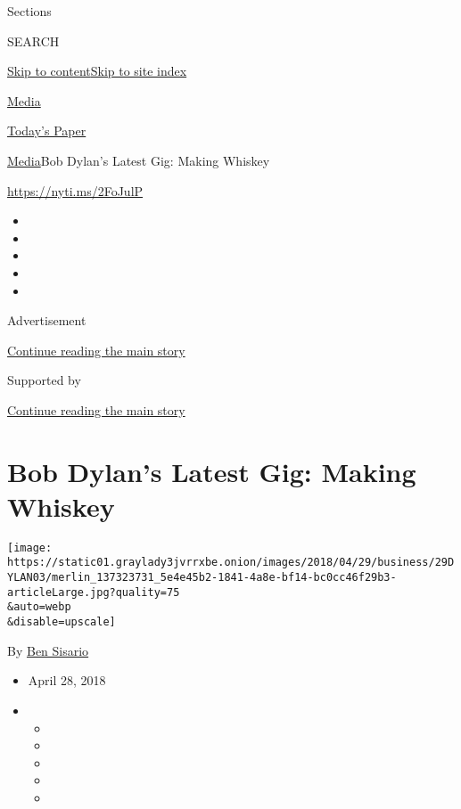 Sections

SEARCH

\protect\hyperlink{site-content}{Skip to
content}\protect\hyperlink{site-index}{Skip to site index}

\href{https://www.nytimes3xbfgragh.onion/section/business/media}{Media}

\href{https://myaccount.nytimes3xbfgragh.onion/auth/login?response_type=cookie\&client_id=vi}{}

\href{https://www.nytimes3xbfgragh.onion/section/todayspaper}{Today's
Paper}

\href{/section/business/media}{Media}\textbar{}Bob Dylan's Latest Gig:
Making Whiskey

\url{https://nyti.ms/2FoJulP}

\begin{itemize}
\item
\item
\item
\item
\item
\end{itemize}

Advertisement

\protect\hyperlink{after-top}{Continue reading the main story}

Supported by

\protect\hyperlink{after-sponsor}{Continue reading the main story}

\hypertarget{bob-dylans-latest-gig-making-whiskey}{%
\section{Bob Dylan's Latest Gig: Making
Whiskey}\label{bob-dylans-latest-gig-making-whiskey}}

\texttt{[image: https://static01.graylady3jvrrxbe.onion/images/2018/04/29/business/29DYLAN03/merlin\_137323731\_5e4e45b2-1841-4a8e-bf14-bc0cc46f29b3-articleLarge.jpg?quality=75\\\&auto=webp\\\&disable=upscale]}

By \href{http://www.nytimes3xbfgragh.onion/by/ben-sisario}{Ben Sisario}

\begin{itemize}
\item
  April 28, 2018
\item
  \begin{itemize}
  \item
  \item
  \item
  \item
  \item
  \end{itemize}
\end{itemize}

